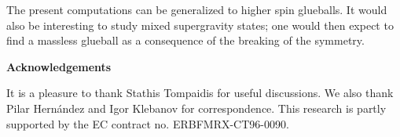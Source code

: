 \documentclass[12pt,epsf,a4paper]{article}
\begin{document}
The present computations can be generalized to higher spin 
glueballs. It would also be interesting to study mixed supergravity 
states; one would then expect to find a massless glueball as a consequence of the 
breaking of the \coordHE{} symmetry.



   
\vspace{8 mm}
  

{\bf Acknowledgements}

It is a pleasure to thank Stathis Tompaidis for useful discussions. We also 
thank Pilar Hern\'andez and Igor Klebanov for correspondence. This research is 
partly supported by the EC contract no. ERBFMRX-CT96-0090.

\newpage


\end{document}
